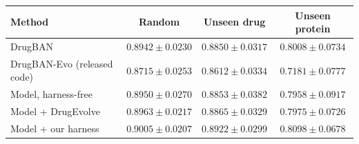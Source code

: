 \begin{tabular}{lccc}
\toprule
Method & Random & Unseen drug & Unseen protein \\
\midrule
DrugBAN & $0.8942 \pm 0.0230$ & $0.8850 \pm 0.0317$ & $0.8008 \pm 0.0734$ \\
DrugBAN-Evo (released code) & $0.8715 \pm 0.0253$ & $0.8612 \pm 0.0334$ & $0.7181 \pm 0.0777$ \\
Model, harness-free & $0.8950 \pm 0.0270$ & $0.8853 \pm 0.0382$ & $0.7958 \pm 0.0917$ \\
Model + DrugEvolve & $0.8963 \pm 0.0217$ & $0.8865 \pm 0.0329$ & $0.7975 \pm 0.0726$ \\
Model + our harness & $0.9005 \pm 0.0207$ & $0.8922 \pm 0.0299$ & $0.8098 \pm 0.0678$ \\
\bottomrule
\end{tabular}
